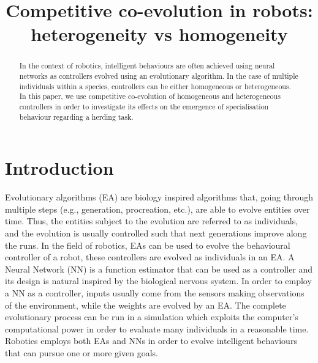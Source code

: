 \documentclass[conference]{IEEEtran}
\begin{document}
 
\title{Competitive co-evolution in robots: \\ heterogeneity vs homogeneity}



\author{
}



\maketitle


\begin{abstract}
In the context of robotics, intelligent behaviours are often achieved using neural networks as controllers evolved using  an evolutionary algorithm.
In the case of multiple individuals within a species, controllers can be either homogeneous or heterogeneous.
In this paper, we use competitive co-evolution of homogeneous and heterogeneous controllers in order to investigate its effects on the emergence of specialisation behaviour regarding a herding task.
\end{abstract}


\IEEEpeerreviewmaketitle


\section{Introduction}
Evolutionary algorithms (EA) are biology inspired algorithms that, going through multiple steps (e.g., generation, procreation, etc.), are able to evolve entities over time.
Thus, the entities subject to the evolution are referred to as individuals,
and the evolution is usually controlled such that next generations improve along the runs.
In the field of robotics, EAs can be used to evolve the behavioural controller of a robot, these controllers are evolved as individuals in an EA.
A Neural Network (NN) is a function estimator that can be used as a controller and its design is natural inspired by the biological nervous system.
In order to employ a NN as a controller, inputs usually come from the sensors making observations of the environment, while the weights are evolved by an EA.
The complete evolutionary process can be run in a simulation which exploits the computer's computational power in order to evaluate many individuals in a reasonable time. 
Robotics employs both EAs and NNs in order to evolve intelligent behaviours that can pursue one or more given goals.
\end{document}

